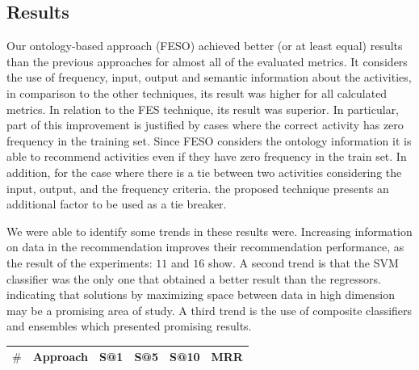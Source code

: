\documentclass[ a0, portrait]{a0poster}
\begin{document}
\begin{multicols}{2}
\section*{Results}
Our ontology-based approach (FESO) achieved better (or at least equal) results than the previous approaches for almost all of the evaluated metrics. It considers the use of frequency, input, output and semantic information about the activities, in comparison to the other techniques, its result was higher for all calculated metrics. In relation to the FES technique, its result was superior. In particular, part of this improvement is justified by cases where the correct activity has zero frequency in the training set. Since FESO considers the ontology information it is able to recommend activities even if they have zero frequency in the train set. In addition, for the case where there is a tie between two activities considering the input, output, and the frequency criteria. the proposed technique presents an additional factor to be used as a tie breaker.

We were able to identify some trends in these results were. Increasing information on data in the recommendation improves their recommendation performance, as the result of the experiments: $11$ and $16$ show. A second trend is that the SVM classifier was the only one that obtained a better result than the regressors. indicating that solutions by maximizing space between data in high dimension may be a promising area of study. A third trend is the use of composite classifiers and ensembles which presented promising results. 

\vspace{1cm}
\centering
\begin{tabular}{|l|l|l|l|l|l|} \hline
\textbf{\(\mathbf{\#}\)} & \textbf{Approach}&\textbf{S@1}&\textbf{S@5} & \textbf{S@10}  & \textbf{MRR} \\ \hline
		

\end{tabular}
\end{multicols}
\end{document}
